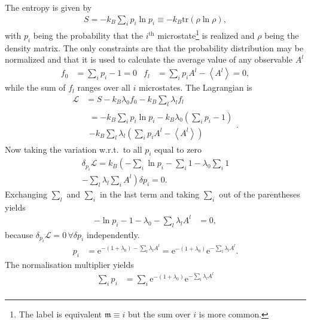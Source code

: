 \documentclass[a4paper,10pt]{article}
\numberwithin{equation}{section}
\begin{document}
\begin{multicols}{2}
The entropy is given by
\begin{align} 
  \boxed{S = -k_B\sum_{i}^{}p_i \ln p_i\equiv -k_B\text{tr}\left(\rho \ln \rho \right)}
,\end{align} 
with $p_i$ being the probability that the $i^{\text{th}}$ microstate\footnote{The label is equivalent $\mathfrak{m}\equiv i$ but the sum over $i$ is more common.} is realized and $\rho $ being the density matrix.
The only constraints are that the probability distribution may be normalized and that it is used to calculate the average value of any observable $A^l$ 
\begin{align} 
  f_0 &= \sum_{i}^{}p_i-1=0 & f_l &= \sum_{i}^{}p_iA^l-\left\langle A^l\right\rangle =0
,\end{align} 
while the sum of $f_l$ ranges over all $i$ microstates.
The Lagrangian is
\begin{align} 
  \mathcal{L} &= S - k_B\lambda _0f_0 - k_B\sum_{l}^{}\lambda _lf_l\\
              &\begin{multlined}
              = -k_B\sum_{i}^{}p_i\ln p_i - k_B\lambda _0\left(\sum_{i}^{}p_i-1\right) \\- k_B\sum_{l}^{}\lambda _l\left(\sum_{i}^{}p_iA^l-\left\langle A^l\right\rangle \right)
              \end{multlined}
.\end{align} 
Now taking the variation w.r.t.\ to all $p_i$ equal to zero
\begin{multline}
  \delta _{p_i}\mathcal{L} = k_B\left(-\sum_{i}^{}\ln p_i - \sum_{i}^{}1 - \lambda _0\sum_{i}^{}1 \right.\\ -\left.\sum_{l}^{}\lambda _l \sum_{i}^{}A^l\right)\delta p_i=0
.\end{multline}
Exchanging $\sum_{l}^{}$ and $\sum_{i}^{}$ in the last term and taking $\sum_{i}^{}$ out of the parentheses yields
\begin{align} 
  -\ln p_i - 1 - \lambda _0 - \sum_{l}^{}\lambda _lA^l &= 0
,\end{align} 
because $\delta _{p_i}\mathcal{L}=0\,\forall \delta p_i$ independently.
\begin{align} 
  p_i &= \text{e}^{-(1 + \lambda _0) - \sum_{l}^{}\lambda _lA^l} = \text{e}^{-(1+\lambda _0)}\text{e}^{-\sum_{l}^{}\lambda _lA^l}
.\end{align} 
The normalisation multiplier yields
\begin{align} 
  \sum_{i}^{}p_i &= \sum_{i}^{}\text{e}^{-(1+\lambda _0)}\text{e}^{-\sum_{l}^{}\lambda _lA^l}\\

\end{align}
\end{multicols}
\end{document}
